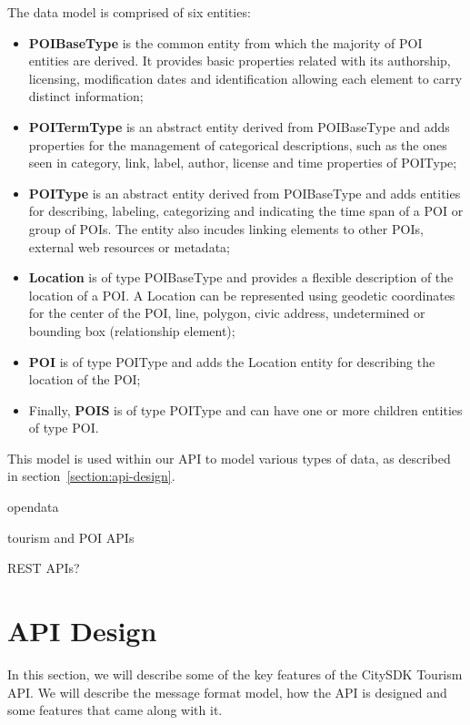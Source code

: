 \documentclass[times]{ettauth}
\begin{document}
The data model is comprised of six entities:
\begin{itemize}
\item \textbf{POIBaseType} is the common entity from which the majority of POI entities are derived. It provides basic properties related with its authorship, licensing, modification dates and identification allowing each element to carry distinct information;
\item \textbf{POITermType} is an abstract entity derived from POIBaseType and adds properties for the management of categorical descriptions, such as the ones seen in category, link, label, author, license and time properties of POIType;
\item \textbf{POIType} is an abstract entity derived from POIBaseType and adds entities for describing, labeling, categorizing and indicating the time span of a POI or group of POIs. The entity also incudes linking elements to other POIs, external web resources or metadata;
\item \textbf{Location} is of type POIBaseType and provides a flexible description of the location of a POI. A Location can be represented using geodetic coordinates for the center of the POI, line, polygon, civic address,  undetermined or bounding box (relationship element);
\item \textbf{POI} is of type POIType and adds the Location entity for describing the location of the POI;
\item Finally, \textbf{POIS} is of type POIType and can have one or more children entities of type POI.
\end{itemize}

This model is used within our API to model various types of data, as described in section~\ref{section:api-design}.

opendata

tourism and POI APIs

REST APIs?


\section{API Design}
In this section, we will describe some of the key features of the CitySDK Tourism API. We will describe the message format model, how the API is designed and some features that came along with it.
\end{document}
